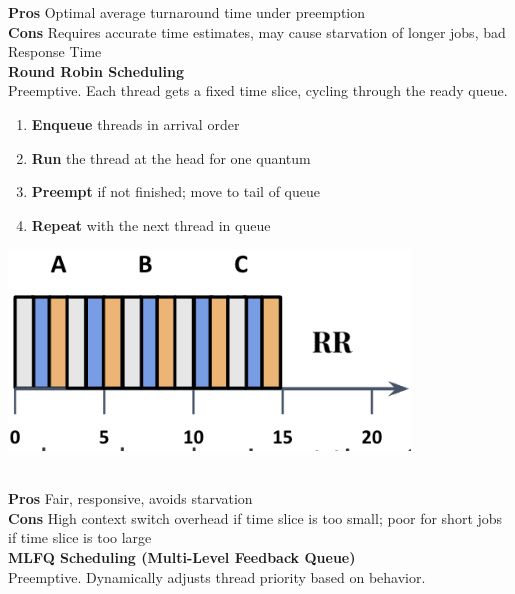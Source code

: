\documentclass[8pt]{extarticle}
\begin{document}
\begin{minipage}[t]{0.5\textwidth}
        \noindent\textbf{Pros} Optimal average turnaround time under preemption \\
        \noindent\textbf{Cons} Requires accurate time estimates, may cause starvation of longer jobs, bad Response Time\\
        \noindent\textbf{Round Robin Scheduling} \\
        Preemptive. Each thread gets a fixed time slice, cycling through the ready queue.\\
        \begin{minipage}[htp]{0.48\textwidth}
        \begin{enumerate}[noitemsep,topsep=0pt]
            \item \textbf{Enqueue} threads in arrival order
            \item \textbf{Run} the thread at the head for one quantum
            \item \textbf{Preempt} if not finished; move to tail of queue
            \item \textbf{Repeat} with the next thread in queue
        \end{enumerate}
        \end{minipage}
        \hfill
        \begin{minipage}[htp]{0.48\textwidth}
            \begin{center}
                \includegraphics[width=0.8\textwidth]{images/round-robin.png}
            \end{center}
        \end{minipage}\\
        \noindent\textbf{Pros} Fair, responsive, avoids starvation \\
        \noindent\textbf{Cons} High context switch overhead if time slice is too small; poor for short jobs if time slice is too large\\
        \noindent\textbf{MLFQ Scheduling (Multi-Level Feedback Queue)} \\
        Preemptive. Dynamically adjusts thread priority based on behavior.\\

\end{minipage}
\end{document}
